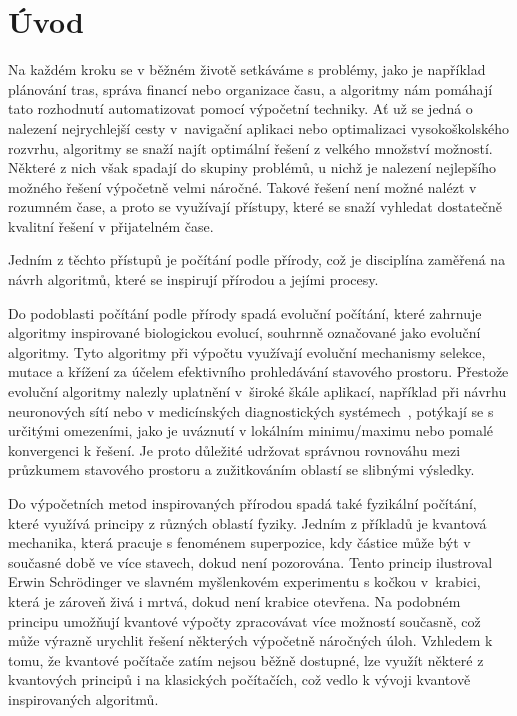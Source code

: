 \chapter{Úvod}
Na každém kroku se v běžném životě setkáváme s problémy, jako je například plánování tras, správa financí nebo organizace času, a algoritmy nám pomáhají tato rozhodnutí automatizovat pomocí výpočetní techniky. 
Ať už se jedná o nalezení nejrychlejší cesty v~navigační aplikaci nebo optimalizaci vysokoškolského rozvrhu, algoritmy se snaží najít optimální řešení z velkého množství možností. 
Některé z nich však spadají do skupiny problémů, u nichž je nalezení nejlepšího možného řešení výpočetně velmi náročné. 
Takové řešení není možné nalézt v rozumném čase, a proto se využívají přístupy, které se snaží vyhledat dostatečně kvalitní řešení v přijatelném čase. 

Jedním z těchto přístupů je počítání podle přírody, což je disciplína zaměřená na návrh algoritmů, které se inspirují přírodou a jejími procesy. 

Do podoblasti počítání podle přírody spadá evoluční počítání, které zahrnuje algoritmy inspirované biologickou evolucí, souhrnně označované jako evoluční algoritmy. 
Tyto algoritmy při výpočtu využívají evoluční mechanismy selekce, mutace a křížení za účelem efektivního prohledávání stavového prostoru. 
Přestože evoluční algoritmy nalezly uplatnění v~široké škále aplikací, například při návrhu neuronových sítí nebo v medicínských diagnostických systémech~\cite{ea-applications}, potýkají se s určitými omezeními, jako je uváznutí v lokálním minimu/maximu nebo pomalé konvergenci k řešení. 
Je proto důležité udržovat správnou rovnováhu mezi průzkumem stavového prostoru a zužitkováním oblastí se slibnými výsledky.

Do výpočetních metod inspirovaných přírodou spadá také fyzikální počítání, které využívá principy z různých oblastí fyziky. 
Jedním z příkladů je kvantová mechanika, která pracuje s fenoménem superpozice, kdy částice může být v současné době ve více stavech, dokud není pozorována. 
Tento princip ilustroval Erwin Schrödinger ve slavném myšlenkovém experimentu s kočkou v~krabici, která je zároveň živá i mrtvá, dokud není krabice otevřena. 
Na podobném principu umožňují kvantové výpočty zpracovávat více možností současně, což může výrazně urychlit řešení některých výpočetně náročných úloh. 
Vzhledem k tomu, že kvantové počítače zatím nejsou běžně dostupné, lze využít některé z kvantových principů i na klasických počítačích, což vedlo k vývoji kvantově inspirovaných algoritmů. 

